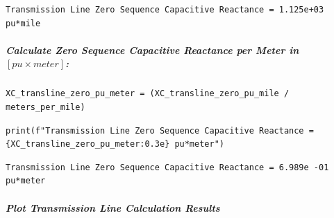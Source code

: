 \begin{verbatim}
Transmission Line Zero Sequence Capacitive Reactance = 1.125e+03 pu*mile
\end{verbatim}

\subparagraph{Calculate Zero Sequence Capacitive Reactance per Meter in $\left[pu \times meter\right]$:}

\begin{verbatim}
XC_transline_zero_pu_meter = (XC_transline_zero_pu_mile / meters_per_mile)
\end{verbatim}

\begin{verbatim}
print(f"Transmission Line Zero Sequence Capacitive Reactance = {XC_transline_zero_pu_meter:0.3e} pu*meter")
\end{verbatim}

\begin{verbatim}
Transmission Line Zero Sequence Capacitive Reactance = 6.989e -01 pu*meter
\end{verbatim}

\subparagraph{Plot Transmission Line Calculation Results}

